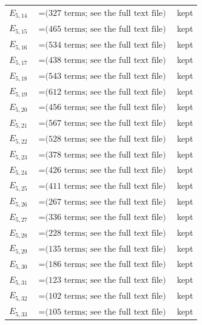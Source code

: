 \documentclass[10pt]{article}
\begin{document}
\begin{longtable}{r>{\raggedright\arraybackslash}p{}>{\raggedright\arraybackslash}p{}}
$E_{5,14}$ & $= \text{(327 terms; see the full text file)}$ & kept \\
$E_{5,15}$ & $= \text{(465 terms; see the full text file)}$ & kept \\
$E_{5,16}$ & $= \text{(534 terms; see the full text file)}$ & kept \\
$E_{5,17}$ & $= \text{(438 terms; see the full text file)}$ & kept \\
$E_{5,18}$ & $= \text{(543 terms; see the full text file)}$ & kept \\
$E_{5,19}$ & $= \text{(612 terms; see the full text file)}$ & kept \\
$E_{5,20}$ & $= \text{(456 terms; see the full text file)}$ & kept \\
$E_{5,21}$ & $= \text{(567 terms; see the full text file)}$ & kept \\
$E_{5,22}$ & $= \text{(528 terms; see the full text file)}$ & kept \\
$E_{5,23}$ & $= \text{(378 terms; see the full text file)}$ & kept \\
$E_{5,24}$ & $= \text{(426 terms; see the full text file)}$ & kept \\
$E_{5,25}$ & $= \text{(411 terms; see the full text file)}$ & kept \\
$E_{5,26}$ & $= \text{(267 terms; see the full text file)}$ & kept \\
$E_{5,27}$ & $= \text{(336 terms; see the full text file)}$ & kept \\
$E_{5,28}$ & $= \text{(228 terms; see the full text file)}$ & kept \\
$E_{5,29}$ & $= \text{(135 terms; see the full text file)}$ & kept \\
$E_{5,30}$ & $= \text{(186 terms; see the full text file)}$ & kept \\
$E_{5,31}$ & $= \text{(123 terms; see the full text file)}$ & kept \\
$E_{5,32}$ & $= \text{(102 terms; see the full text file)}$ & kept \\
$E_{5,33}$ & $= \text{(105 terms; see the full text file)}$ & kept \\

\end{longtable}
\end{document}
